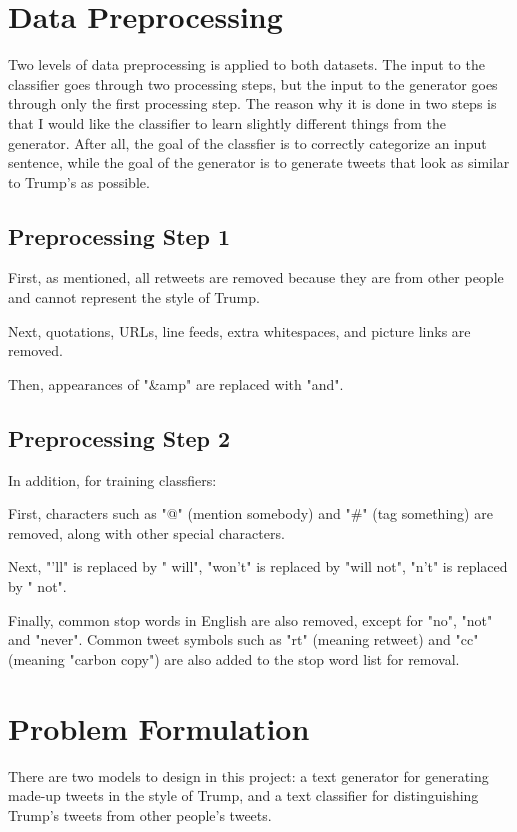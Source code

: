 \documentclass{article}
\begin{document}
\section{Data Preprocessing}
Two levels of data preprocessing is applied to both datasets. The input to the classifier goes through two processing steps, but the input to the generator goes through only the first processing step. The reason why it is done in two steps is that I would like the classifier to learn slightly different things from the generator. After all, the goal of the classfier is to correctly categorize an input sentence, while the goal of the generator is to generate tweets that look as similar to Trump's as possible.

\subsection{Preprocessing Step 1}
First, as mentioned, all retweets are removed because they are from other people and cannot represent the style of Trump.

Next, quotations, URLs, line feeds, extra whitespaces, and picture links are removed. 

Then, appearances of "\&amp" are replaced with "and".

\subsection{Preprocessing Step 2}
In addition, for training classfiers:

First, characters such as "@" (mention somebody) and "\#" (tag something) are removed, along with other special characters.

Next, "'ll" is replaced by " will", "won't" is replaced by "will not", "n't" is replaced by " not".

Finally, common stop words in English are also removed, except for "no", "not" and "never". Common tweet symbols such as "rt" (meaning retweet) and "cc" (meaning "carbon copy") are also added to the stop word list for removal.

\section{Problem Formulation}
There are two models to design in this project: a text generator for generating made-up tweets in the style of Trump, and a text classifier for distinguishing Trump's tweets from other people's tweets.
\end{document}
